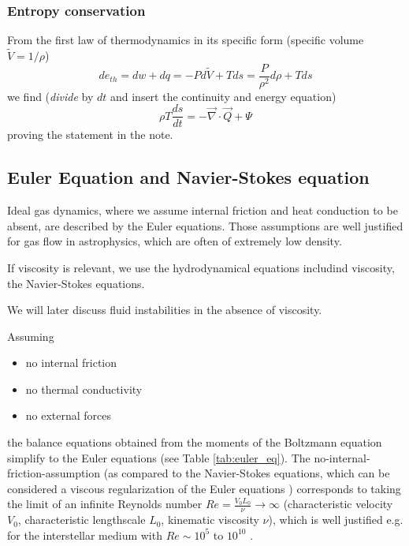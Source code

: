 \subsubsection{Entropy conservation}
From the first law of thermodynamics in its specific form (specific volume $\tilde{V} = 1/\rho$)
\begin{equation}
    de_{th} = dw + dq = -P d\tilde{V} + Tds = \frac{P}{\rho^2} d\rho + T ds
\end{equation}
we find (\textit{divide} by $dt$ and insert the continuity and energy equation)
\begin{equation}
    \rho T \frac{ds}{dt} = -\vec{\nabla} \cdot \vec{Q} + \Psi
\end{equation}
proving the statement in the note.

\subsection{Euler Equation and Navier-Stokes equation}
\textcolor{blue1}{Ideal gas dynamics}, where we assume internal friction and heat conduction to be absent,
are described by the \textcolor{blue1}{Euler equations}. Those assumptions are well justified for gas flow
in astrophysics, which are often of extremely low density.

\textcolor{blue1}{If viscosity is relevant}, we use the hydrodynamical equations includind viscosity,
the \textcolor{blue1}{Navier-Stokes equations}.

We will later discuss fluid instabilities in the absence of viscosity.

Assuming
\begin{itemize}
    \item no internal friction
    \item no thermal conductivity
    \item no external forces
\end{itemize}
the balance equations obtained from the moments of the Boltzmann equation simplify to the Euler
equations (see Table \ref{tab:euler_eq}). The no-internal-friction-assumption (as compared to the Navier-Stokes equations, which
can be considered a viscous regularization of the Euler equations \citep[Sec. 1]{Constantin2004}) corresponds to taking the
limit of an infinite Reynolds number $Re = \frac{V_0 L_0}{\nu} \rightarrow \infty$ (characteristic 
velocity $V_0$, characteristic lengthscale $L_0$, kinematic viscosity $\nu$), which is well justified
e.g. for the interstellar medium with $Re \sim 10^5$ to $10^{10}$ \citep{sormani22}.

